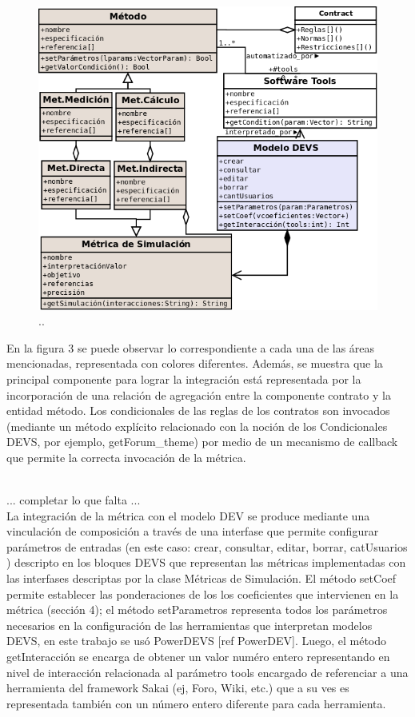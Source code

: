 \begin{figure} [ht]
\begin{center}
 \includegraphics[scale=0.4]{Ch7/I.png}
  \caption{..}\label{}
\end{center}
\end{figure}


En la figura 3 se puede observar lo correspondiente a cada una de las áreas mencionadas, representada con colores diferentes. Además, se muestra que la principal componente para lograr la integración está representada por la incorporación de una relación de agregación entre la componente contrato y la entidad método. Los condicionales de las reglas de los contratos son invocados (mediante un método explícito relacionado con la noción de los Condicionales DEVS, por ejemplo, getForum\_theme) por medio de un mecanismo de callback que permite la correcta invocación de la métrica. 

\\
... completar lo que falta ...
\\

La integración de la métrica con el modelo DEV se produce mediante una vinculación de composición a través de una interfase que permite configurar parámetros de entradas (en este caso: crear, consultar, editar, borrar, catUsuarios ) descripto en los bloques DEVS que representan las métricas implementadas con las interfases descriptas por la clase Métricas de Simulación. El método setCoef  permite establecer las ponderaciones de los los coeficientes que intervienen en la métrica (sección 4); el método setParametros representa todos los parámetros necesarios en la configuración de las herramientas que interpretan modelos DEVS, en este trabajo se usó  PowerDEVS [ref PowerDEV]. Luego, el método getInteracción se encarga de obtener un valor numéro entero representando en nivel de interacción relacionada al parámetro tools  encargado de referenciar a una herramienta del framework Sakai (ej, Foro, Wiki, etc.) que a su ves es representada también con un número entero diferente para cada herramienta. 

